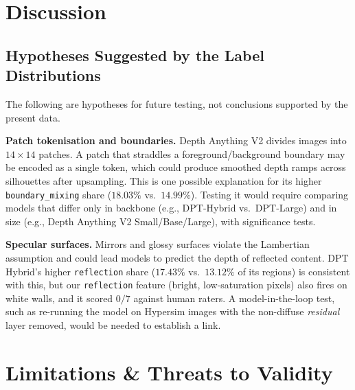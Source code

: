 \documentclass[11pt,a4paper]{article}
\begin{document}
\section{Discussion}
\label{sec:discussion}

\subsection{Hypotheses Suggested by the Label Distributions}
The following are hypotheses for future testing, not conclusions supported by the present data.

\textbf{Patch tokenisation and boundaries.} Depth Anything V2 divides images into $14 \times 14$ patches. A patch that straddles a foreground/background boundary may be encoded as a single token, which could produce smoothed depth ramps across silhouettes after upsampling. This is one possible explanation for its higher \texttt{boundary\_mixing} share ($18.03\%$ vs.\ $14.99\%$). Testing it would require comparing models that differ only in backbone (e.g., DPT-Hybrid vs.\ DPT-Large) and in size (e.g., Depth Anything V2 Small/Base/Large), with significance tests.

\textbf{Specular surfaces.} Mirrors and glossy surfaces violate the Lambertian assumption and could lead models to predict the depth of reflected content. DPT Hybrid's higher \texttt{reflection} share ($17.43\%$ vs.\ $13.12\%$ of its regions) is consistent with this, but our \texttt{reflection} feature (bright, low-saturation pixels) also fires on white walls, and it scored $0/7$ against human raters. A model-in-the-loop test, such as re-running the model on Hypersim images with the non-diffuse \emph{residual} layer removed, would be needed to establish a link.

\section{Limitations \& Threats to Validity}
\label{sec:limitations}
\end{document}
